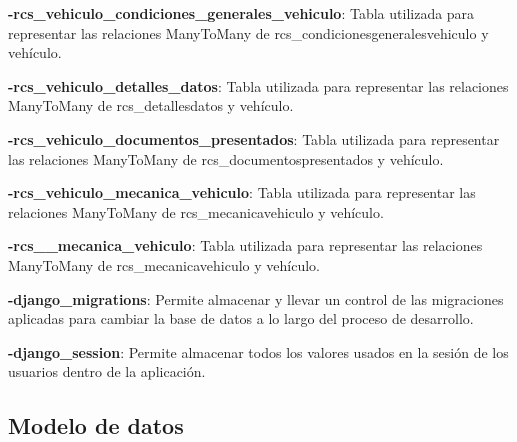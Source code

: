 \textbf{-rcs\_vehiculo\_condiciones\_generales\_vehiculo}: Tabla utilizada para representar las relaciones ManyToMany de rcs\_condicionesgeneralesvehiculo y vehículo.

\textbf{-rcs\_vehiculo\_detalles\_datos}: Tabla utilizada para representar las relaciones ManyToMany de rcs\_detallesdatos y vehículo.

\textbf{-rcs\_vehiculo\_documentos\_presentados}: Tabla utilizada para representar las relaciones ManyToMany de rcs\_documentospresentados y vehículo.

\textbf{-rcs\_vehiculo\_mecanica\_vehiculo}: Tabla utilizada para representar las relaciones ManyToMany de rcs\_mecanicavehiculo y vehículo.

\textbf{-rcs\_\_mecanica\_vehiculo}: Tabla utilizada para representar las relaciones ManyToMany de rcs\_mecanicavehiculo y vehículo.

\textbf{-django\_migrations}: Permite almacenar y llevar un control de las migraciones aplicadas para cambiar la base de datos a lo largo del proceso de desarrollo.

\textbf{-django\_session}: Permite almacenar todos los valores usados en la sesión de los usuarios dentro de la aplicación.

\setlength{\parskip}{0mm}

\newpage


\subsection{Modelo de datos}
\setlength{\parskip}{5mm}

